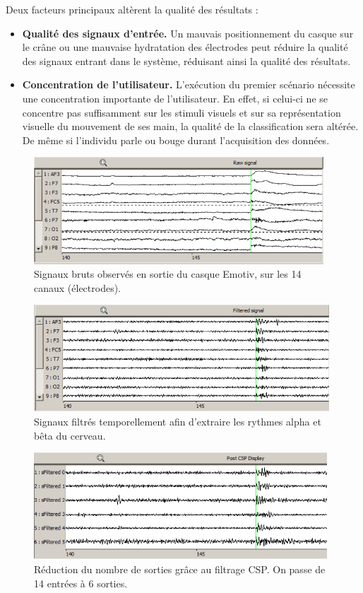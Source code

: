 Deux facteurs principaux altèrent la qualité des résultats :
\smallbreak
\begin{itemize}
	\item \textbf{Qualité des signaux d'entrée.} Un mauvais positionnement du casque sur le crâne ou une mauvaise hydratation des électrodes peut réduire la qualité des signaux entrant dans le système, réduisant ainsi la qualité des résultats.
	\smallbreak
	\item \textbf{Concentration de l'utilisateur.}  L'exécution du premier scénario nécessite une concentration importante de l'utilisateur. En effet, si celui-ci ne se concentre pas suffisamment sur les stimuli visuels et sur sa représentation visuelle du mouvement de ses main, la qualité de la classification sera altérée. De même si l'individu parle ou bouge durant l'acquisition des données.
\end{itemize}


\begin{figure}[h]
	\centering\includegraphics[height=4cm]{images/xpRawSignal.png}
	\caption[Signaux bruts observés en sortie du casque Emotiv]{Signaux bruts observés en sortie du casque Emotiv, sur les 14 canaux (électrodes).}
	\label{xpBrut}
\end{figure}

\begin{figure}[h]
	\centering\includegraphics[height=4cm]{images/xpFilteredSignal.png}
	\caption[Signaux filtrés]{Signaux filtrés temporellement afin d'extraire les rythmes alpha et bêta du cerveau.}
	\label{xpFiltered}
\end{figure}

\begin{figure}[h]
	\centering\includegraphics[height=4cm]{images/xpCsp.png}
	\caption[Réduction du nombre de sorties grâce au filtrage CSP]{Réduction du nombre de sorties grâce au filtrage CSP. On passe de 14 entrées à 6 sorties.}
	\label{xpCsp}
\end{figure}

